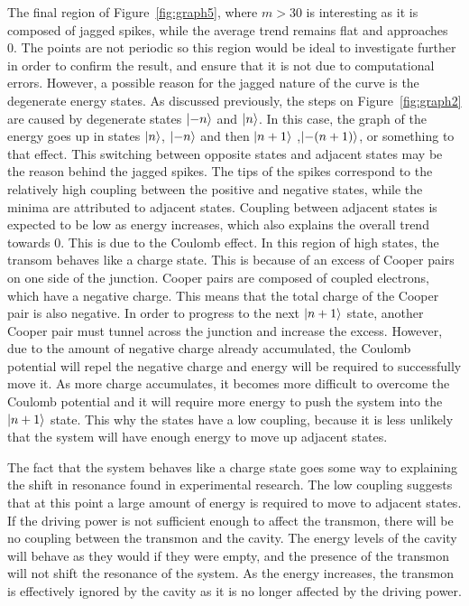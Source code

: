 \documentclass[11pt]{article}
\begin{document}
The final region of Figure~\ref{fig:graph5}, where $m>30$ is interesting as it is composed of jagged spikes, while the average trend remains flat and approaches 0. The points are not periodic so this region would be ideal to investigate further in order to confirm the result, and ensure that it is not due to computational errors. However, a possible reason for the jagged nature of the curve is the degenerate energy states. As discussed previously, the steps on Figure~\ref{fig:graph2} are caused by degenerate states $\ket{-n}$ and $\ket{n}$. In this case, the graph of the energy goes up in states $\ket{n}$, $\ket{-n}$ and then $\ket{n+1}$ ,$\ket{-(n+1)}$, or something to that effect. This switching between opposite states and adjacent states may be the reason behind the jagged spikes. The tips of the spikes correspond to the relatively high coupling between the positive and negative states, while the minima are attributed to adjacent states. Coupling between adjacent states is expected to be low as energy increases, which also explains the overall trend towards 0. This is due to the Coulomb effect. In this region of high states, the transom behaves like a charge state. This is because of an excess of Cooper pairs on one side of the junction. Cooper pairs are composed of coupled electrons, which have a negative charge. This means that the total charge of the Cooper pair is also negative. In order to progress to the next $\ket{n+1}$ state, another Cooper pair must tunnel across the junction and increase the excess. However, due to the amount of negative charge already accumulated, the Coulomb potential will repel the negative charge and energy will be required to successfully move it. As more charge accumulates, it becomes more difficult to overcome the Coulomb potential and it will require more energy to push the system into the $\ket{n+1}$ state. This why the states have a low coupling, because it is less unlikely that the system will have enough energy to move up adjacent states.

The fact that the system behaves like a charge state goes some way to explaining the shift in resonance found in experimental research. The low coupling suggests that at this point a large amount of energy is required to move to adjacent states. If the driving power is not sufficient enough to affect the transmon, there will be no coupling between the transmon and the cavity. The energy levels of the cavity will behave as they would if they were empty, and the presence of the transmon will not shift the resonance of the system. As the energy increases, the transmon is effectively ignored by the cavity as it is no longer affected by the driving power.
\end{document}
